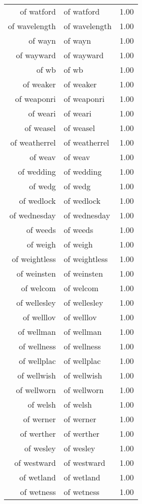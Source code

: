\begin{table}[ht]
\begin{tabular}{rlr}
  of watford & of watford & 1.00 \\ 
  of wavelength & of wavelength & 1.00 \\ 
  of wayn & of wayn & 1.00 \\ 
  of wayward & of wayward & 1.00 \\ 
  of wb & of wb & 1.00 \\ 
  of weaker & of weaker & 1.00 \\ 
  of weaponri & of weaponri & 1.00 \\ 
  of weari & of weari & 1.00 \\ 
  of weasel & of weasel & 1.00 \\ 
  of weatherrel & of weatherrel & 1.00 \\ 
  of weav & of weav & 1.00 \\ 
  of wedding & of wedding & 1.00 \\ 
  of wedg & of wedg & 1.00 \\ 
  of wedlock & of wedlock & 1.00 \\ 
  of wednesday & of wednesday & 1.00 \\ 
  of weeds & of weeds & 1.00 \\ 
  of weigh & of weigh & 1.00 \\ 
  of weightless & of weightless & 1.00 \\ 
  of weinsten & of weinsten & 1.00 \\ 
  of welcom & of welcom & 1.00 \\ 
  of wellesley & of wellesley & 1.00 \\ 
  of welllov & of welllov & 1.00 \\ 
  of wellman & of wellman & 1.00 \\ 
  of wellness & of wellness & 1.00 \\ 
  of wellplac & of wellplac & 1.00 \\ 
  of wellwish & of wellwish & 1.00 \\ 
  of wellworn & of wellworn & 1.00 \\ 
  of welsh & of welsh & 1.00 \\ 
  of werner & of werner & 1.00 \\ 
  of werther & of werther & 1.00 \\ 
  of wesley & of wesley & 1.00 \\ 
  of westward & of westward & 1.00 \\ 
  of wetland & of wetland & 1.00 \\ 
  of wetness & of wetness & 1.00 \\ 

\end{tabular}
\end{table}
